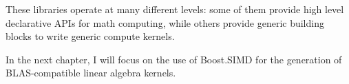 \documentclass[../main]{subfiles}
\begin{document}
These libraries operate at many different levels: some of them provide
high level declarative APIs for math computing, while others provide generic
building blocks to write generic compute kernels.

In the next chapter, I will focus on the use of Boost.SIMD \cite{bsimd}
for the generation of BLAS-compatible linear algebra kernels.
\end{document}
